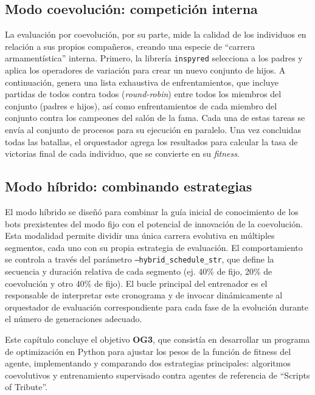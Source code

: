 \subsection{Modo coevolución: competición interna} \label{sec:modo_coevolucion_competicion}

La evaluación por coevolución, por su parte, mide la calidad de los individuos en relación a sus propios compañeros, creando una especie de ``carrera armamentística'' interna. Primero, la librería \texttt{inspyred} selecciona a los padres y aplica los operadores de variación para crear un nuevo conjunto de hijos. A continuación, genera una lista exhaustiva de enfrentamientos, que incluye partidas de todos contra todos (\textit{round-robin}) entre todos los miembros del conjunto (padres e hijos), así como enfrentamientos de cada miembro del conjunto contra los campeones del salón de la fama. Cada una de estas tareas se envía al conjunto de procesos para su ejecución en paralelo. Una vez concluidas todas las batallas, el orquestador agrega los resultados para calcular la tasa de victorias final de cada individuo, que se convierte en su \textit{fitness}.

\subsection{Modo híbrido: combinando estrategias} \label{sec:modo_hibrido_combinando}

El modo híbrido se diseñó para combinar la guía inicial de conocimiento de los bots prexistentes del modo fijo con el potencial de innovación de la coevolución. Esta modalidad permite dividir una única carrera evolutiva en múltiples segmentos, cada uno con su propia estrategia de evaluación. El comportamiento se controla a través del parámetro \texttt{--hybrid\_schedule\_str}, que define la secuencia y duración relativa de cada segmento (ej. 40\% de fijo, 20\% de coevolución y otro 40\% de fijo). El bucle principal del entrenador es el responsable de interpretar este cronograma y de invocar dinámicamente al orquestador de evaluación correspondiente para cada fase de la evolución durante el número de generaciones adecuado.

Este capítulo concluye el objetivo \textbf{OG3}, que consistía en desarrollar un programa de optimización en Python para ajustar los pesos de la función de fitness del agente, implementando y comparando dos estrategias principales: algoritmos coevolutivos y entrenamiento supervisado contra agentes de referencia de ``Scripts of Tribute''.
